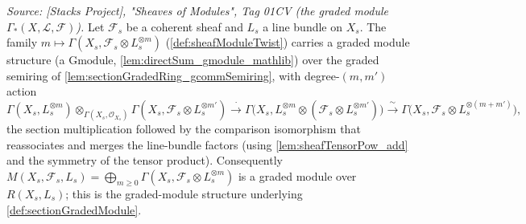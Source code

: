 \begin{lemma}
  \label{lem:sectionGradedModule_gmodule}
  \textit{Source: [Stacks Project], "Sheaves of Modules", Tag 01CV (the graded
  module \(\Gamma_*(X,\mathcal{L},\mathcal{F})\)).}
  Let \(\mathcal{F}_s\) be a coherent sheaf and \(L_s\) a line bundle on
  \(X_s\). The family
  \(m \mapsto \Gamma(X_s, \mathcal{F}_s \otimes L_s^{\otimes m})\)
  (\cref{def:sheafModuleTwist}) carries a graded module structure (a
  \(\mathrm{Gmodule}\), \cref{lem:directSum_gmodule_mathlib}) over the graded
  semiring of \cref{lem:sectionGradedRing_gcommSemiring}, with degree-\((m,m')\)
  action
  \[
    \Gamma(X_s, L_s^{\otimes m}) \otimes_{\Gamma(X_s,\mathcal{O}_{X_s})}
      \Gamma(X_s, \mathcal{F}_s \otimes L_s^{\otimes m'})
    \xrightarrow{\ \cdot\ }
    \Gamma\bigl(X_s, L_s^{\otimes m} \otimes
      (\mathcal{F}_s \otimes L_s^{\otimes m'})\bigr)
    \xrightarrow{\ \sim\ }
    \Gamma\bigl(X_s, \mathcal{F}_s \otimes L_s^{\otimes (m+m')}\bigr),
  \]
  the section multiplication followed by the comparison isomorphism that
  reassociates and merges the line-bundle factors (using
  \cref{lem:sheafTensorPow_add} and the symmetry of the tensor product).
  Consequently \(M(X_s, \mathcal{F}_s, L_s) = \bigoplus_{m \ge 0}
  \Gamma(X_s, \mathcal{F}_s \otimes L_s^{\otimes m})\) is a graded module over
  \(R(X_s, L_s)\); this is the graded-module structure underlying
  \cref{def:sectionGradedModule}.
\end{lemma}

